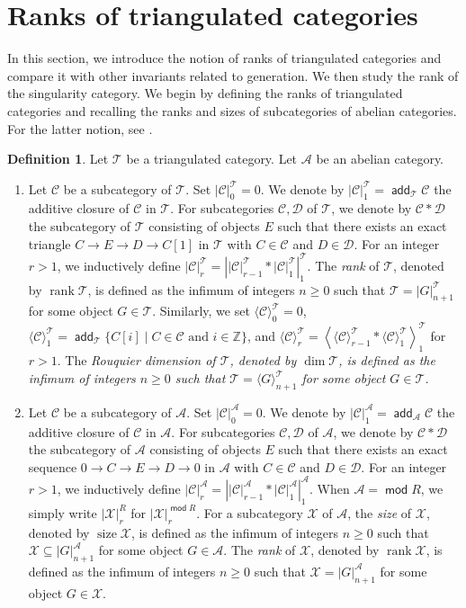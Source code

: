 \documentclass[10pt]{amsart}
\theoremstyle{definition}
\newtheorem{dfn}[thm]{Definition}
\theoremstyle{remark}
\numberwithin{equation}{thm}
\def\A{\mathcal{A}}
\def\add{\operatorname{\mathsf{add}}}
\def\C{\mathcal{C}}
\def\D{\mathcal{D}}
\def\dim{\operatorname{dim}}
\def\ge{\geqslant}
\def\mod{\operatorname{\mathsf{mod}}}
\def\rank{\operatorname{rank}}
\def\size{\operatorname{size}}
\def\T{\mathcal{T}}
\def\X{\mathcal{X}}
\begin{document}
\section{Ranks of triangulated categories}
In this section, we introduce the notion of ranks of triangulated categories and compare it with other invariants related to generation. 
We then study the rank of the singularity category.
We begin by defining the ranks of triangulated categories and recalling the ranks and sizes of subcategories of abelian categories.
For the latter notion, see \cite{DT2014,IT2016}.
\begin{dfn}\label{def_rank}
Let $\T$ be a triangulated category.
Let $\A$ be an abelian category.
\begin{enumerate}[\rm(1)]
\item
Let $\C$ be a subcategory of $\T$.
Set ${|\C|}_{0}^{\T}=0$.
We denote by ${|\C|}_{1}^{\T}=\add_{\T}\C$ the additive closure of $\C$ in $\T$.
For subcategories $\C,\D$ of $\T$, we denote by $\C\ast\D$ the subcategory of $\T$ consisting of objects $E$ such that there exists an exact triangle
$C\to E\to D\to C[1]$
in $\T$ with $C\in\C$ and $D\in\D$.
For an integer $r>1$, we inductively define ${|\C|}_{r}^{\T}={\left|{|\C|}_{r-1}^{\T}\ast{|\C|}_{1}^{\T}\right|}_{1}^{\T}$.
The {\em rank} of $\T$, denoted by $\rank\T$, is defined as the infimum of integers $n\ge 0$ such that $\T={|G|}_{n+1}^{\T}$ for some object $G\in\T$.
Similarly, we set ${\langle\C\rangle}_{0}^{\T}=0$, ${\langle\C\rangle}_{1}^{\T}=\add_{\T}\{C[i]\mid C\in\C\text{ and }i\in\mathbb{Z}\}$, and ${\langle\C\rangle}_{r}^{\T}={\left\langle{\langle\C\rangle}_{r-1}^{\T}\ast{\langle\C\rangle}_{1}^{\T}\right\rangle}_{1}^{\T}$ for $r>1$.
The \em{Rouquier dimension} of $\T$, denoted by $\dim\T$, is defined as the infimum of integers $n\ge 0$ such that $\T={\langle G\rangle}_{n+1}^{\T}$ for some object $G\in\T$.
\item
Let $\C$ be a subcategory of $\A$.
Set ${|\C|}_{0}^{\A}=0$.
We denote by ${|\C|}_{1}^{\A}=\add_{\A}\C$ the additive closure of $\C$ in $\A$.
For subcategories $\C,\D$ of $\A$, we denote by $\C\ast\D$ the subcategory of $\A$ consisting of objects $E$ such that there exists an exact sequence
$0\to C\to E\to D\to 0$
in $\A$ with $C\in\C$ and $D\in\D$.
For an integer $r>1$, we inductively define ${|\C|}_{r}^{\A}={\left|{|\C|}_{r-1}^{\A}\ast{|\C|}_{1}^{\A}\right|}_{1}^{\A}$.
When $\A=\mod R$, we simply write ${|\X|}_{r}^{R}$ for ${|\X|}_{r}^{\mod R}$.
For a subcategory $\X$ of $\A$, the {\em size} of $\X$, denoted by $\size\X$, is defined as the infimum of integers $n\ge 0$ such that $\X\subseteq {|G|}_{n+1}^{\A}$ for some object $G\in\A$.
The {\em rank} of $\X$, denoted by $\rank\X$, is defined as the infimum of integers $n\ge 0$ such that $\X={|G|}_{n+1}^{\A}$ for some object $G\in\X$.
\end{enumerate}
\end{dfn}
\end{document}
